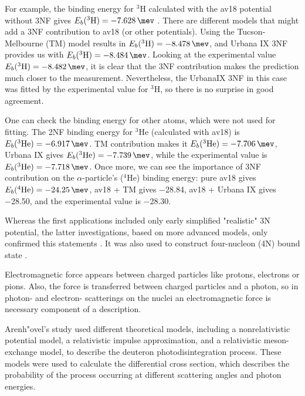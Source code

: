 For example, the binding energy for $^3$H calculated with the \gls{av18} potential without 3NF gives
$E_b(^3\mathrm{H}) = \SI{-7.628}{\mev}$ \cite{NoggaAV18}. There are different models that might add a 3NF
contribution to \gls{av18} (or other potentials). Using the Tucson-Melbourne (TM) model \cite{Tucson-Melbourne}
results in $E_b(^3\mathrm{H}) = \SI{-8.478}{\mev}$, and Urbana IX \cite{Urbana3NF} 3NF provides us with
$E_b(^3\mathrm{H}) = \SI{-8.484}{\mev}$. Looking at the experimental value $E_b(^3\mathrm{H}) = \SI{-8.482}{\mev}$,
it is clear that the 3NF contribution makes the prediction much closer to the measurement. Nevertheless, the UrbanaIX
3NF in this case was fitted by the experimental value for $^3\mathrm{H}$, so there is no surprise in good agreement.

One can check the binding energy for other atoms, which were not used for fitting. The 2NF binding energy for $^3$He
(calculated with \gls{av18}) is $E_b(^3\mathrm{He}) = \SI{-6.917}{\mev}$. TM contribution makes it
$E_b(^3\mathrm{He}) = \SI{-7.706}{\mev}$, Urbana IX gives $E_b(^3\mathrm{He}) = \SI{-7.739}{\mev}$, while the
experimental value is $E_b(^3\mathrm{He}) = \SI{-7.718}{\mev}$. Once more, we can see the importance of 3NF
contribution on the $\alpha$-particle's ($^4\mathrm{He}$) binding energy: pure \gls{av18} gives
$E_b(^4\mathrm{He}) = \SI{-24.25}{\mev}$, \gls{av18} + TM gives \SI{-28.84}{\mev}, \gls{av18} + Urbana IX gives
\SI{-28.50}{\mev}, and the experimental value is \SI{-28.30}{\mev}.

Whereas the first applications included only early simplified "realistic" 3N potential, the latter
investigations, based on more advanced models, only confirmed this statements \cite{StoksPhysRevC49, AV18Wiringa}.
It was also used to construct four-nucleon (4N) bound state \cite{NoggaPhysRevLett}.

Electromagnetic force appears between charged particles like protons, electrons or pions.
Also, the force is transferred between charged particles and a photon, so 
in photon- and electron- scatterings on the nuclei an electromagnetic
force is necessary component of a description.

Arenh"{o}vel's study \cite{ArenhovelPhotodisint1991} used different theoretical models, including a nonrelativistic potential model,
a relativistic impulse approximation, and a relativistic meson-exchange model, to describe the deuteron photodisintegration process.
These models were used to calculate the differential cross section, which describes the probability
of the process occurring at different scattering angles and photon energies.


